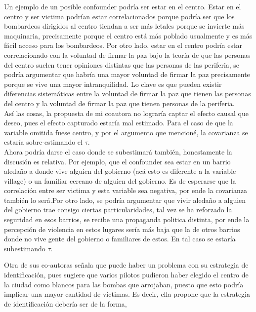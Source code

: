 \documentclass[a4paper, answers, addpoints, 11pt]{exam}
\begin{document}
\begin{enumerate}
\begin{mdframed}
        Un ejemplo de un posible confounder podría ser estar en el centro. Estar en el centro y ser victima podrían estar correlacionados porque podría ser que los bombardeos dirigidos al centro tiendan a ser más letales porque se invierte más maquinaria, precisamente porque el centro está más poblado usualmente y es más fácil acceso para los bombardeos. Por otro lado, estar en el centro podría estar correlacionado con la voluntad de firmar la paz bajo la teoría de que las personas del centro suelen tener opiniones distintas que las personas de las periferia, se podría argumentar que habría una mayor voluntad de firmar la paz precisamente porque se vive una mayor intranquilidad. Lo clave es que pueden existir diferencias sistemáticas entre la voluntad de firmar la paz que tienen las personas del centro y la voluntad de firmar la paz que tienen personas de la periferia.\\

        Así las cosas, la propuesta de mi coautora no lograría captar el efecto causal que deseo, pues el efecto capturado estaría mal estimado. Para el caso de que la variable omitida fuese centro, y por el argumento que mencioné, la covarianza se estaría sobre-estimando el $\tau$.\\
        
        Ahora podría darse el caso donde se subestimará también, honestamente la discusión es relativa. Por ejemplo, que el confounder sea estar en un barrio aledaño a donde vive alguien del gobierno (acá esto es diferente a la variable village) o un familiar cercano de alguien del gobierno. Es de esperarse que la correlación entre ser victima y esta variable sea negativa, por ende la covarianza también lo será.Por otro lado, se podría argumentar que vivir aledaño a alguien del gobierno trae consigo ciertas particularidades, tal vez se ha reforzado la seguridad en esos barrios, se recibe una propaganda politica distinta, por ende la percepción de violencia en estos lugares sería más baja que la de otros barrios donde no vive gente del gobierno o familiares de estos. En tal caso se estaría subestimando $\tau$.
        \end{mdframed}

    
\end{enumerate}

    Otra de sus co-autoras señala que puede haber un problema con su estrategia de identificación, pues sugiere que varios pilotos pudieron haber elegido el centro de la ciudad como blancos para las bombas que arrojaban, puesto que esto podría implicar una mayor cantidad de víctimas. Es decir, ella propone que la estrategia de identificación debería ser de la forma,
\end{document}

